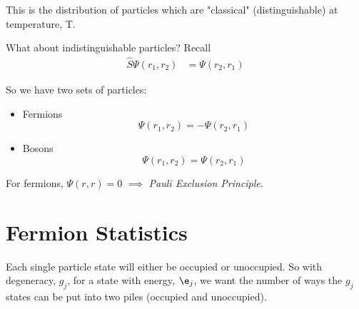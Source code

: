 \documentclass[a4paper, 11pt, normalem]{report}
\begin{document}
This is the distribution of particles which are "classical" (distinguishable) at temperature, T. 

What about indistinguishable particles?
Recall
\begin{align}
    \hat{S}\Psi(r_1,r_2) &= \Psi(r_2,r_1) 
\end{align}

So we have two sets of particles:
\begin{itemize}
    \item Fermions
        \begin{equation}
            \Psi(r_1,r_2) = -\Psi(r_2,r_1)
        \end{equation}
    \item Bosons
        \begin{equation}
            \Psi(r_1,r_2) = \Psi(r_2,r_1)
        \end{equation}
\end{itemize}
For fermions, $\Psi(r,r) = 0$ $\implies$ \emph{Pauli Exclusion Principle.}

\section{Fermion Statistics}
Each single particle state will either be occupied or unoccupied. 
So with degeneracy, $g_j$, for a state with energy, $\e_j$, we want the number of ways the $g_j$ states can be put into two piles (occupied and unoccupied).
\end{document}
